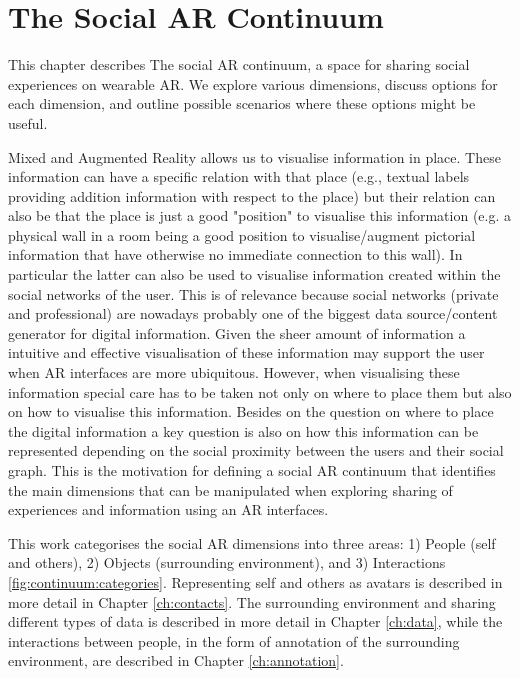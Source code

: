 \chapter{The Social AR Continuum}
\label{ch:continuum}

This chapter describes The social AR continuum, a space for sharing social experiences on wearable AR. We explore various dimensions, discuss options for each dimension, and outline possible scenarios where these options might be useful.

Mixed and Augmented Reality allows us to visualise information in place. These information can have a specific relation with that place (e.g., textual labels providing addition information with respect to the place) but their relation can also be that the place is just a good "position" to visualise this information (e.g. a physical wall in a room being a good position to visualise/augment pictorial information that have otherwise no immediate connection to this wall). In particular the latter can also be used to visualise information created within the social networks of the user. This is of relevance because social networks (private and professional) are nowadays probably one of the biggest data source/content generator for digital information. Given the sheer amount of information a intuitive and effective visualisation of these information may support the user when AR interfaces are more ubiquitous. However, when visualising these information special care has to be taken not only on where to place them but also on how to visualise this information. Besides on the question on where to place the digital information a key question is also on how this information can be represented depending on the social proximity between the users and their social graph. This is the motivation for defining a social AR continuum that identifies the main dimensions that can be manipulated when exploring sharing of experiences and information using an AR interfaces. 

This work categorises the social AR dimensions into three areas: 1) People (self and others), 2) Objects (surrounding environment), and 3) Interactions \ref{fig:continuum:categories}. Representing self and others as avatars is described in more detail in Chapter \ref{ch:contacts}. The surrounding environment and sharing different types of data is described in more detail in Chapter \ref{ch:data}, while the interactions between people, in the form of annotation of the surrounding environment, are described in Chapter \ref{ch:annotation}.

